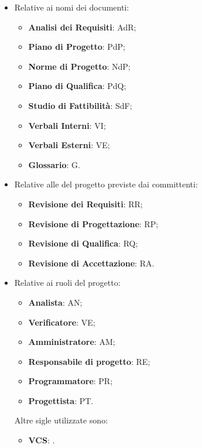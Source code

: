 \begin{itemize}
    \item Relative ai nomi dei documenti:
    \begin{itemize}
        \item \textbf{Analisi dei Requisiti}: AdR;
        \item \textbf{Piano di Progetto}: PdP;
        \item \textbf{Norme di Progetto}: NdP;
        \item \textbf{Piano di Qualifica}: PdQ;
        \item \textbf{Studio di Fattibilità}: SdF;
        \item \textbf{Verbali Interni}: VI;
        \item \textbf{Verbali Esterni}: VE;
        \item \textbf{Glossario}: G.
    \end{itemize}
    \item Relative alle  del progetto previste dai committenti:
    \begin{itemize}
        \item \textbf{Revisione dei Requisiti}: RR;
        \item \textbf{Revisione di Progettazione}: RP;
        \item \textbf{Revisione di Qualifica}: RQ;
        \item \textbf{Revisione di Accettazione}: RA.
    \end{itemize}
    \item Relative ai ruoli del progetto:
    \begin{itemize}
        \item \textbf{Analista}: AN;
        \item \textbf{Verificatore}: VE;
        \item \textbf{Amministratore}: AM;
        \item \textbf{Responsabile di progetto}: RE;
        \item \textbf{Programmatore}: PR;
        \item \textbf{Progettista}: PT.
    \end{itemize}
    Altre sigle utilizzate sono:
    \begin{itemize}
        \item \textbf{VCS}: .
    \end{itemize}
\end{itemize}

